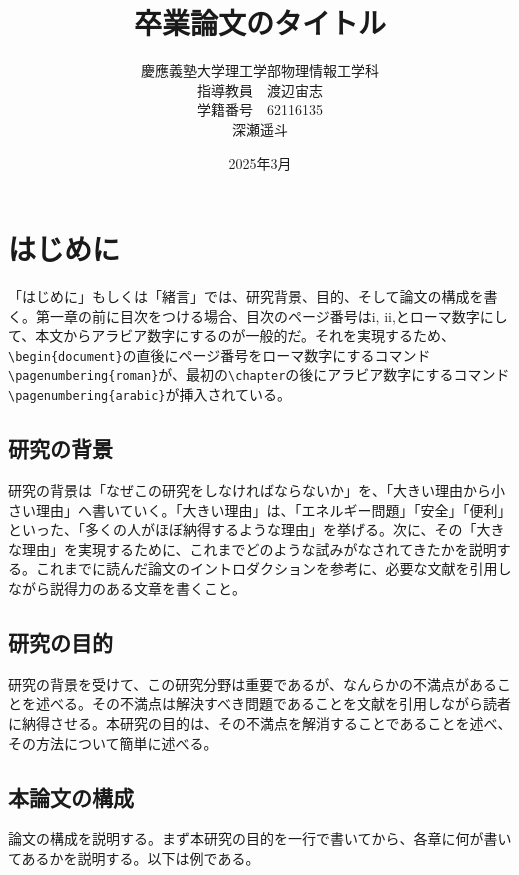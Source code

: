 \documentclass[titlepage]{jsreport}
\title{卒業論文のタイトル}
\author{慶應義塾大学理工学部物理情報工学科\\
指導教員　渡辺宙志\\
学籍番号　62116135\\
深瀬遥斗}
\date{2025年3月}
\begin{document}
\maketitle
\setcounter{tocdepth}{2}
\tableofcontents

\chapter{はじめに} \label{chap:introduction}

「はじめに」もしくは「緒言」では、研究背景、目的、そして論文の構成を書く。第一章の前に目次をつける場合、目次のページ番号はi, ii,とローマ数字にして、本文からアラビア数字にするのが一般的だ。それを実現するため、\verb|\begin{document}|の直後にページ番号をローマ数字にするコマンド\verb|\pagenumbering{roman}|が、最初の\verb|\chapter|の後にアラビア数字にするコマンド\verb|\pagenumbering{arabic}|が挿入されている。

\section{研究の背景}

研究の背景は「なぜこの研究をしなければならないか」を、「大きい理由から小さい理由」へ書いていく。「大きい理由」は、「エネルギー問題」「安全」「便利」といった、「多くの人がほぼ納得するような理由」を挙げる。次に、その「大きな理由」を実現するために、これまでどのような試みがなされてきたかを説明する。これまでに読んだ論文のイントロダクションを参考に、必要な文献を引用しながら説得力のある文章を書くこと。

\section{研究の目的}

研究の背景を受けて、この研究分野は重要であるが、なんらかの不満点があることを述べる。その不満点は解決すべき問題であることを文献を引用しながら読者に納得させる。本研究の目的は、その不満点を解消することであることを述べ、その方法について簡単に述べる。

\section{本論文の構成}

論文の構成を説明する。まず本研究の目的を一行で書いてから、各章に何が書いてあるかを説明する。以下は例である。
\end{document}
